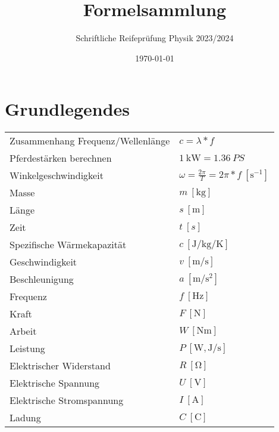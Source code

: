\documentclass[12pt,a4paper]{paper}
\title{Formelsammlung}
\subtitle{Schriftliche Reifeprüfung Physik 2023/2024}
\author{}
\date{\today}
\makeatletter
\newcommand{\mathleft}{\@fleqntrue\@mathmargin0pt}
\makeatother
\begin{document}
\maketitle
\mathleft
\section{Grundlegendes}
\begin{tabularx}{\textwidth}{X|X}
Zusammenhang Frequenz/Wellenlänge & $c = \lambda * f$\\
Pferdestärken berechnen & $\qty{1}{\kilo\watt} = \qty{1.36}{PS}$\\
Winkelgeschwindigkeit & $\omega = \frac{2\pi}{T}=2\pi*f\:[\unit{\second^{-1}}]$ \\
Masse & $m\: [\unit{\kilo\gram}]$ \\
Länge & $s\: [\unit{\meter}]$\\
Zeit & $t\:[s]$\\
Spezifische Wärmekapazität & $c\: [\unit{\joule\per\kilo\gram\per\kelvin}]$\\
Geschwindigkeit & $v\:[\unit{\meter\per\second}]$\\
Beschleunigung & $a\:[\unit{\meter\per\second\squared}]$\\
Frequenz & $f\: [\unit{\hertz}]$\\
Kraft & $F\: [\unit{\newton}]$\\
Arbeit & $W \: [\unit{\newton\meter}]$\\
Leistung & $P \: [\unit{\watt},\unit{\joule\per\second}]$\\
Elektrischer Widerstand & $R\:[\unit{\ohm}]$\\
Elektrische Spannung & $U\:[\unit{\volt}]$\\
Elektrische Stromspannung & $I\:[\unit{\ampere}]$\\
Ladung & $C\:[\unit{\coulomb}]$
\end{tabularx}
\end{document}
